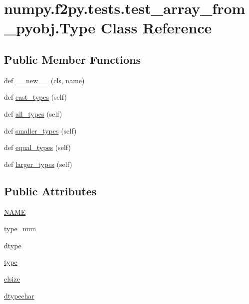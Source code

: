 \hypertarget{classnumpy_1_1f2py_1_1tests_1_1test__array__from__pyobj_1_1Type}{}\section{numpy.\+f2py.\+tests.\+test\+\_\+array\+\_\+from\+\_\+pyobj.\+Type Class Reference}
\label{classnumpy_1_1f2py_1_1tests_1_1test__array__from__pyobj_1_1Type}
\subsection*{Public Member Functions}
\begin{DoxyCompactItemize}
\item 
def \hyperlink{classnumpy_1_1f2py_1_1tests_1_1test__array__from__pyobj_1_1Type_a045e71e911b80b8531c871a6fe430e6a}{\+\_\+\+\_\+new\+\_\+\+\_\+} (cls, name)
\item 
def \hyperlink{classnumpy_1_1f2py_1_1tests_1_1test__array__from__pyobj_1_1Type_aa6c42f843e19f76abbfdf3fbd73200fa}{cast\+\_\+types} (self)
\item 
def \hyperlink{classnumpy_1_1f2py_1_1tests_1_1test__array__from__pyobj_1_1Type_a7f1a8e3b63a12536c18745167903bc14}{all\+\_\+types} (self)
\item 
def \hyperlink{classnumpy_1_1f2py_1_1tests_1_1test__array__from__pyobj_1_1Type_ac9ba7107fec2977db223c3784e75ac7a}{smaller\+\_\+types} (self)
\item 
def \hyperlink{classnumpy_1_1f2py_1_1tests_1_1test__array__from__pyobj_1_1Type_ac68ba74b82b11c0e9ed681205b0562b6}{equal\+\_\+types} (self)
\item 
def \hyperlink{classnumpy_1_1f2py_1_1tests_1_1test__array__from__pyobj_1_1Type_a7230f5ee8df4ae4b19dd54585471e671}{larger\+\_\+types} (self)
\end{DoxyCompactItemize}
\subsection*{Public Attributes}
\begin{DoxyCompactItemize}
\item 
\hyperlink{classnumpy_1_1f2py_1_1tests_1_1test__array__from__pyobj_1_1Type_ab1754a93f8a27eff06c5cc72622b2a7f}{N\+A\+ME}
\item 
\hyperlink{classnumpy_1_1f2py_1_1tests_1_1test__array__from__pyobj_1_1Type_ab9e3e9fd5e7ecca275b4a2a0c6879b5a}{type\+\_\+num}
\item 
\hyperlink{classnumpy_1_1f2py_1_1tests_1_1test__array__from__pyobj_1_1Type_aea74fb750722aaf3da972380288e884f}{dtype}
\item 
\hyperlink{classnumpy_1_1f2py_1_1tests_1_1test__array__from__pyobj_1_1Type_abb693980d3472ba9ec7688eec49baafb}{type}
\item 
\hyperlink{classnumpy_1_1f2py_1_1tests_1_1test__array__from__pyobj_1_1Type_acefd3b32deb26173de0c2adb63df7655}{elsize}
\item 
\hyperlink{classnumpy_1_1f2py_1_1tests_1_1test__array__from__pyobj_1_1Type_a328fbdb3654b0635f854d15ca373d713}{dtypechar}
\end{DoxyCompactItemize}


